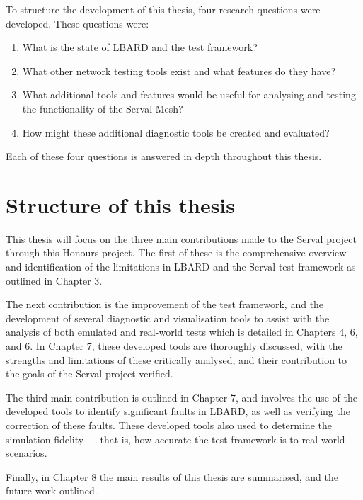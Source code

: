 To structure the development of this thesis, four research questions were developed.
These questions were:
\begin{enumerate}
    \item What is the state of LBARD and the test framework?
    \item What other network testing tools exist and what features do they have?
    \item What additional tools and features would be useful for analysing and testing the functionality of the Serval Mesh?
    \item How might these additional diagnostic tools be created and evaluated?
\end{enumerate}
Each of these four questions is answered in depth throughout this thesis.


\section{Structure of this thesis}

This thesis will focus on the three main contributions made to the Serval project through this Honours project.
The first of these is the comprehensive overview and identification of the limitations in LBARD and the Serval test framework as outlined in Chapter 3.

The next contribution is the improvement of the test framework, and the development of several diagnostic and visualisation tools to assist with the analysis of both emulated and real-world tests which is detailed in Chapters 4, 6, and 6. 
In Chapter 7, these developed tools are thoroughly discussed, with the strengths and limitations of these critically analysed, and their contribution to the goals of the Serval project verified. 

The third main contribution is outlined in Chapter 7, and involves the use of the developed tools to identify significant faults in LBARD, as well as verifying the correction of these faults.
These developed tools also used to determine the simulation fidelity — that is, how accurate the test framework is to real-world scenarios.

Finally, in Chapter 8 the main results of this thesis are summarised, and the future work outlined.

